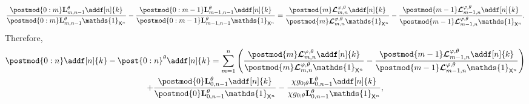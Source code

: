 \documentclass{article}
\newcommand{\precpar}{\varphi}
\newcommand{\1}{\mathbbm{1}}
\newcommand{\retrokmod}{\boldsymbol{\mathcal{L}}^{\precpar,\theta}}
\newcommand{\uk}[1]{\mathbf{L}_{#1}}
\newcommand{\Xset}{\mathsf{X}}
\newcommand{\md}[1]{g_{#1}}
\newcommand{\parvec}{\theta}
\def\1{\mathds{1}}
\begin{document}
$$
\frac{\postmod{0:m} \uk{m, n - 1}^\theta \addf[n]{k}}{\postmod{0:m} \uk{m, n - 1}^\theta \1_{\Xset^n}} - \frac{\postmod{0:m - 1} \uk{m - 1, n - 1}^\theta \addf[n]{k}}{\postmod{0:m - 1} \uk{m - 1, n - 1}^\theta \1_{\Xset^n}} 
= \frac{\postmod{m} \retrokmod_{m, n} \addf[n]{k}}{\postmod{m} \retrokmod_{m, n} \1_{\Xset^n}} - \frac{\postmod{m - 1} \retrokmod_{m - 1, n} \addf[n]{k}}{\postmod{m - 1} \retrokmod_{m - 1, n} \1_{\Xset^n}}. 
$$
Therefore,
\begin{multline*}
\postmod{0:n} \addf[n]{k} - \post{0:n}^\theta \addf[n]{k} = 
\sum_{m = 1}^n \left( \frac{\postmod{m} \retrokmod_{m, n} \addf[n]{k}}{\postmod{m} \retrokmod_{m, n} \1_{\Xset^n}} - \frac{\postmod{m - 1} \retrokmod_{m - 1, n} \addf[n]{k}}{\postmod{m - 1} \retrokmod_{m - 1, n} \1_{\Xset^n}} \right) \\ + \frac{\postmod{0} \uk{0, n - 1}^\theta \addf[n]{k}}{\postmod{0} \uk{0, n - 1}^\theta \1_{\Xset^n}} - \frac{\chi \md{0;\parvec}\uk{0, n - 1}^\theta \addf[n]{k}}{\chi\md{0;\parvec}\uk{0, n - 1}^\theta \1_{\Xset^n}},
\end{multline*}
\end{document}
